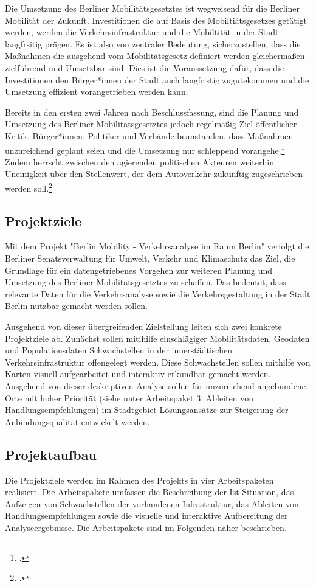 Die Umsetzung des Berliner Mobilitätsgesetztes ist wegweisend für die Berliner Mobilität der Zukunft. Investitionen die auf Basis des Mobiltiätsgesetzes getätigt werden, werden die Verkehrsinfrastruktur und die Mobiltität in der Stadt langfrsitig prägen. Es ist also von zentraler Bedeutung, sicherzustellen, dass die Maßnahmen die ausgehend vom Mobilitätsgesetz definiert werden gleichermaßen zielführend und Umsetzbar sind. Dies ist die Voraussetzung dafür, dass die Investitionen den Bürger*innen der Stadt auch langfristig zugutekommen und die Umsetzung effizient vorangetrieben werden kann.

Bereits in den ersten zwei Jahren nach Beschlussfassung, sind die Planung und Umsetzung des Berliner Mobilitätsgesetztes jedoch regelmäßig Ziel öffentlicher Kritik. Bürger*innen, Politiker und Verbände beanstanden, dass Maßnahmen unzureichend geplant seien und die Umsetzung nur schleppend vorangehe.\footcite{Tagesspiegel.2019} Zudem herrscht zwischen den agierenden politischen Akteuren weiterhin Uneinigkeit über den Stellenwert, der dem Autoverkehr zukünftig zugeschrieben werden soll.\footcite{Tagesspiegel.2020} 

\subsection{Projektziele}
Mit dem Projekt "Berlin Mobility - Verkehrsanalyse im Raum Berlin" verfolgt die Berliner Senatsverwaltung für Umwelt, Verkehr und Klimaschutz das Ziel, die Grundlage für ein datengetriebenes Vorgehen zur weiteren Planung und Umsetzung des Berliner Mobilitätsgesetztes zu schaffen. Das bedeutet, dass relevante Daten für die Verkehrsanalyse sowie die Verkehrsgestaltung in der Stadt Berlin nutzbar gemacht werden sollen.

Ausgehend von dieser übergreifenden Zielstellung leiten sich zwei konkrete Projektziele ab. Zunächst sollen mitihilfe einschlägiger Mobilitätsdaten, Geodaten und Populationsdaten Schwachstellen in der innerstädtischen Verkehrsinfrastruktur offengelegt werden. Diese Schwachstellen sollen mithilfe von Karten visuell aufgearbeitet und interaktiv erkundbar gemacht werden. Ausgehend von dieser deskriptiven Analyse sollen für unzureichend angebundene Orte mit hoher Priorität (siehe unter Arbeitspaket 3: Ableiten von Handlungsempfehlungen) im Stadtgebiet Lösungsansätze zur Steigerung der Anbindungsqualität entwickelt werden.

\subsection{Projektaufbau}
Die Projektziele werden im Rahmen des Projekts in vier Arbeitspaketen realisiert. Die Arbeitspakete umfassen die Beschreibung der Ist-Situation, das Aufzeigen von Schwachstellen der vorhandenen Infrastruktur, das Ableiten von Handlungsempfehlungen sowie die visuelle und interaktive Aufbereitung der Analyseergebnisse. Die Arbeitspakete sind im Folgenden näher beschrieben.

